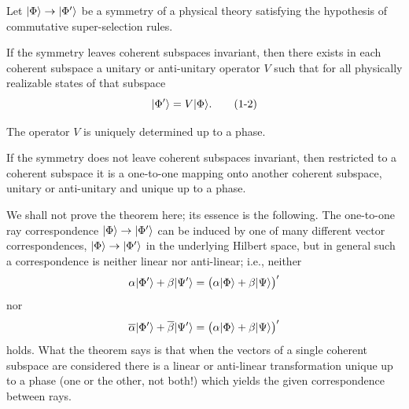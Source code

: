 \begin{theorem}[1-1]\label{thm:ch1-symmetry}
Let \(\lvert \Phi\rangle\to\lvert \Phi'\rangle\) be a symmetry of a physical theory
satisfying the hypothesis of commutative super-selection rules.

If the symmetry leaves coherent subspaces invariant, then there exists in each
coherent subspace a unitary or anti-unitary operator \(V\) such that for all
physically realizable states of that subspace
\begin{equation}
  \lvert \Phi'\rangle=V\lvert \Phi\rangle.
  \tag{1-2}\label{eq:ch1-symmetry-action}
\end{equation}

The operator \(V\) is uniquely determined up to a phase.

If the symmetry does not leave coherent subspaces invariant, then restricted to
a coherent subspace it is a one-to-one mapping onto another coherent
subspace, unitary or anti-unitary and unique up to a phase.
\end{theorem}

We shall not prove the theorem here; its essence is the following. The
one-to-one ray correspondence \(\lvert \Phi\rangle\to\lvert \Phi'\rangle\) can be induced by
one of many different vector correspondences, \(\lvert \Phi\rangle\to\lvert \Phi'\rangle\) in
the underlying Hilbert space, but in general such a correspondence is neither
linear nor anti-linear; i.e., neither
\begin{equation*}
  \alpha\lvert \Phi'\rangle+\beta\lvert \Psi'\rangle
  =\bigl(\alpha\lvert \Phi\rangle+\beta\lvert \Psi\rangle\bigr)'
\end{equation*}
nor
\begin{equation*}
  \overline{\alpha}\lvert \Phi'\rangle+\overline{\beta}\lvert \Psi'\rangle
  =\bigl(\alpha\lvert \Phi\rangle+\beta\lvert \Psi\rangle\bigr)'
\end{equation*}
holds. What the theorem says is that when the vectors of a single coherent
subspace are considered there is a linear or anti-linear transformation unique
up to a phase (one or the other, not both!) which yields the given
correspondence between rays.

